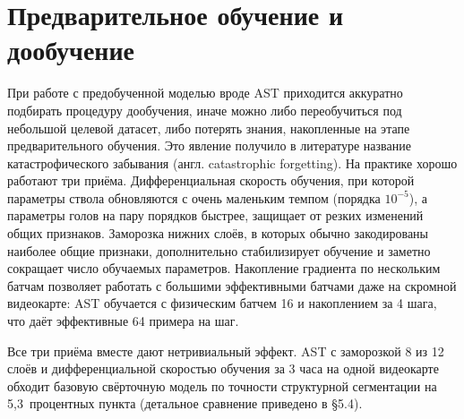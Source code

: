\section{Предварительное обучение и дообучение}\label{sec:1-7}

При работе с предобученной моделью вроде AST приходится аккуратно подбирать процедуру дообучения, иначе можно либо переобучиться под небольшой целевой датасет, либо потерять знания, накопленные на этапе предварительного обучения. Это явление получило в литературе название катастрофического забывания (англ. catastrophic forgetting). На практике хорошо работают три приёма. Дифференциальная скорость обучения, при которой параметры ствола обновляются с очень маленьким темпом (порядка $10^{-5}$), а параметры голов на пару порядков быстрее, защищает от резких изменений общих признаков. Заморозка нижних слоёв, в которых обычно закодированы наиболее общие признаки, дополнительно стабилизирует обучение и заметно сокращает число обучаемых параметров. Накопление градиента по нескольким батчам позволяет работать с большими эффективными батчами даже на скромной видеокарте: AST обучается с физическим батчем 16 и накоплением за 4 шага, что даёт эффективные 64 примера на шаг.

Все три приёма вместе дают нетривиальный эффект. AST с заморозкой 8 из 12 слоёв и дифференциальной скоростью обучения за 3 часа на одной видеокарте обходит базовую свёрточную модель по точности структурной сегментации на 5{,}3~процентных пункта (детальное сравнение приведено в §5.4).
